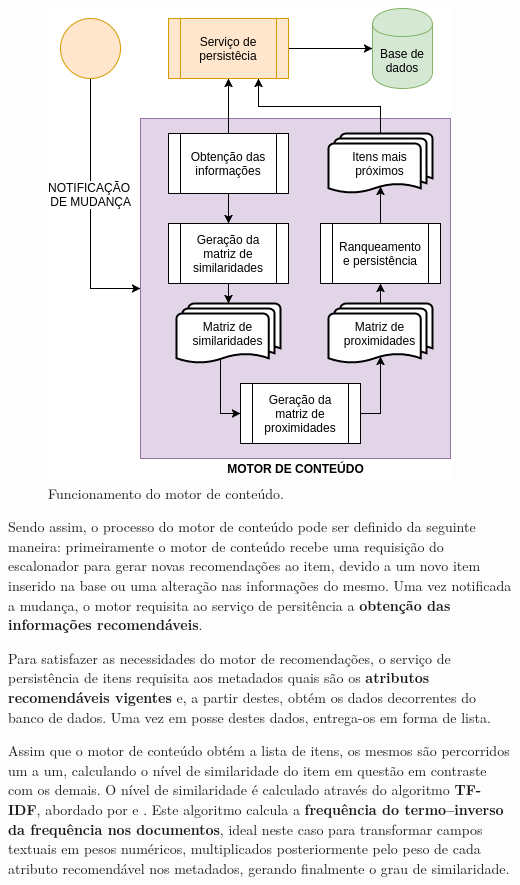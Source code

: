 \documentclass[12pt, openright, oneside, a4paper, brazil]{abntex2}
\begin{document}
\begin{figure}[h!tp]
	\caption{\label{content_engine}Funcionamento do motor de conteúdo.}
	\begin{center}
		\includegraphics[scale=0.8]{images/content_engine.png}
	\end{center}
	\hspace{5.5cm}{Fonte: O Autor.}
\end{figure}

Sendo assim, o processo do motor de conteúdo pode ser definido da seguinte maneira: primeiramente o motor de conteúdo recebe uma requisição do escalonador para gerar novas recomendações ao item, devido a um novo item inserido na base ou uma alteração nas informações do mesmo. Uma vez notificada a mudança, o motor requisita ao serviço de persitência a \textbf{obtenção das informações recomendáveis}.

Para satisfazer as necessidades do motor de recomendações, o serviço de persistência de itens requisita aos metadados quais são os \textbf{atributos recomendáveis vigentes} e, a partir destes, obtém os dados decorrentes do banco de dados. Uma vez em posse destes dados, entrega-os em forma de lista.

Assim que o motor de conteúdo obtém a lista de itens, os mesmos são percorridos um a um, calculando o nível de similaridade do item em questão em contraste com os demais. O nível de similaridade é calculado através do algoritmo \textbf{TF-IDF}, abordado por  e . Este algoritmo calcula a \textbf{frequência do termo–inverso da frequência nos documentos}, ideal neste caso para transformar campos textuais em pesos numéricos, multiplicados posteriormente pelo peso de cada atributo recomendável nos metadados, gerando finalmente o grau de similaridade.
\end{document}
